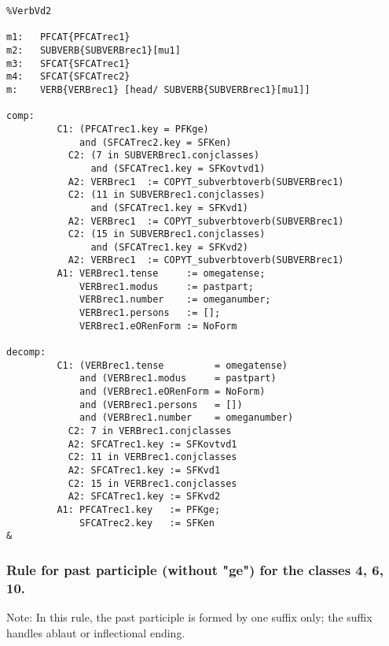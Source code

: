 \begin{verbatim}
%VerbVd2 

m1:   PFCAT{PFCATrec1}
m2:   SUBVERB{SUBVERBrec1}[mu1]
m3:   SFCAT{SFCATrec1}
m4:   SFCAT{SFCATrec2}
m:    VERB{VERBrec1} [head/ SUBVERB{SUBVERBrec1}[mu1]]

comp:
         C1: (PFCATrec1.key = PFKge) 
             and (SFCATrec2.key = SFKen)
           C2: (7 in SUBVERBrec1.conjclasses)
               and (SFCATrec1.key = SFKovtvd1) 
           A2: VERBrec1  := COPYT_subverbtoverb(SUBVERBrec1)
           C2: (11 in SUBVERBrec1.conjclasses)
               and (SFCATrec1.key = SFKvd1) 
           A2: VERBrec1  := COPYT_subverbtoverb(SUBVERBrec1)
           C2: (15 in SUBVERBrec1.conjclasses) 
               and (SFCATrec1.key = SFKvd2) 
           A2: VERBrec1  := COPYT_subverbtoverb(SUBVERBrec1)
         A1: VERBrec1.tense     := omegatense;
             VERBrec1.modus     := pastpart;
             VERBrec1.number    := omeganumber;
             VERBrec1.persons   := [];
             VERBrec1.eORenForm := NoForm

decomp:
         C1: (VERBrec1.tense         = omegatense) 
             and (VERBrec1.modus     = pastpart)
             and (VERBrec1.eORenForm = NoForm) 
             and (VERBrec1.persons   = [])
             and (VERBrec1.number    = omeganumber)
           C2: 7 in VERBrec1.conjclasses
           A2: SFCATrec1.key := SFKovtvd1 
           C2: 11 in VERBrec1.conjclasses 
           A2: SFCATrec1.key := SFKvd1
           C2: 15 in VERBrec1.conjclasses 
           A2: SFCATrec1.key := SFKvd2 
         A1: PFCATrec1.key   := PFKge;
             SFCATrec2.key   := SFKen
&
\end{verbatim}
\newpage
\subsubsection{Rule for past participle (without "ge") for the classes  4, 6, 10.}

Note: In this rule, the past participle is formed by one suffix only; the 
suffix handles ablaut or inflectional ending.

